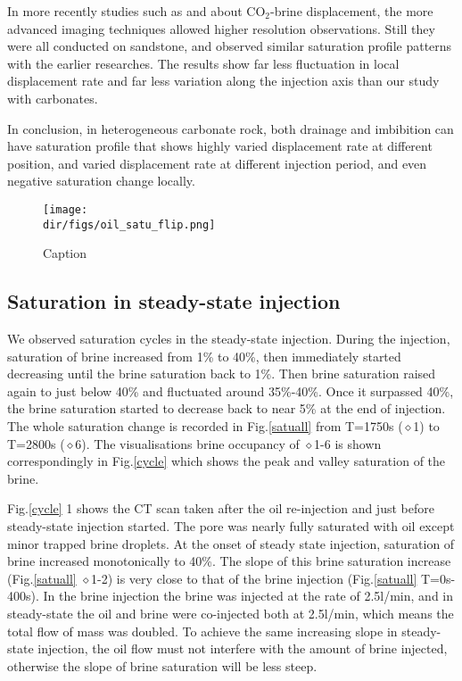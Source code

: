 In more recently studies such as \citet{alemu2011influence} and \citet{shi2011supercritical} about CO$_2$-brine displacement, the more advanced imaging techniques allowed higher resolution observations. Still they were all conducted on sandstone, and observed similar saturation profile patterns with the earlier researches. The results show far less fluctuation in local displacement rate and far less variation along the injection axis than our study with carbonates. 

In conclusion, in heterogeneous carbonate rock, both drainage and imbibition can have saturation profile that shows highly varied displacement rate at different position, and varied displacement rate at different injection period, and even negative saturation change locally.

\begin{figure}
    \centering
    \texttt{[image: \\dir/figs/oil\_satu\_flip.png]}
    \caption{Caption}   
    \label{oilsatu}
\end{figure}
 
\subsection{Saturation in steady-state injection}\label{subsection_sssaturation}
We observed saturation cycles in the steady-state injection. During the injection, saturation of brine increased from 1\% to 40\%, then immediately started decreasing until the brine saturation back to 1\%. Then brine saturation raised again to just below 40\% and fluctuated around 35\%-40\%. Once it surpassed 40\%, the brine saturation started to decrease back to near 5\% at the end of injection. The whole saturation change is recorded in Fig.\ref{satuall} from T=1750s ($\diamond$1) to T=2800s ($\diamond$6). The visualisations brine occupancy of $\diamond$1-6 is shown correspondingly in Fig.\ref{cycle} which shows the peak and valley saturation of the brine. 

Fig.\ref{cycle} 1 shows the CT scan taken after the oil re-injection and just before steady-state injection started. The pore was nearly fully saturated with oil except minor trapped brine droplets. At the onset of steady state injection, saturation of brine increased monotonically to 40\%. The slope of this brine saturation increase (Fig.\ref{satuall} $\diamond$1-2) is very close to that of the brine injection (Fig.\ref{satuall} T=0s-400s). In the brine injection the brine was injected at the rate of 2.5\textmu l/min, and in steady-state the oil and brine were co-injected both at 2.5\textmu l/min, which means the total flow of mass was doubled. To achieve the same increasing slope in steady-state injection, the oil flow must not interfere with the amount of brine injected, otherwise the slope of brine saturation will be less steep. 

